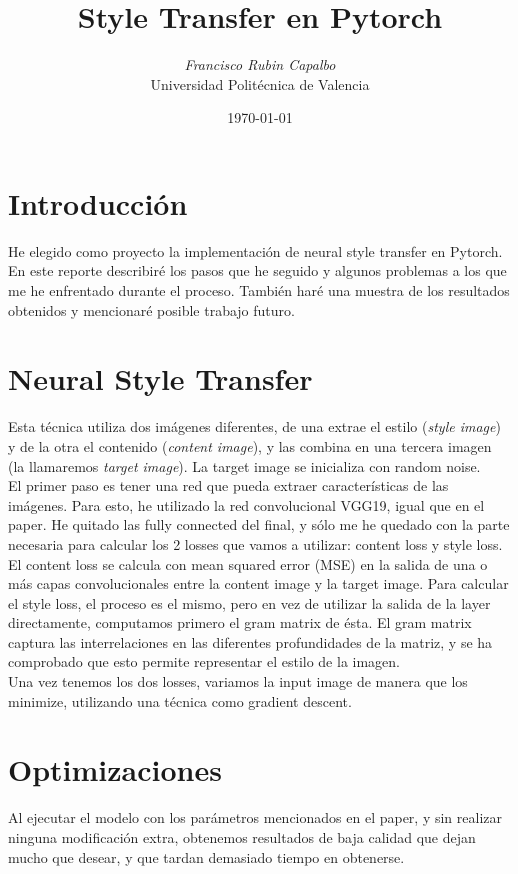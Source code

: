 \documentclass[a4paper, 11pt]{article}
\title{\Large{\textbf{Style Transfer en Pytorch}}}
\author{\textit{Francisco Rubin Capalbo}\\
		Universidad Politécnica de Valencia }
\date{\today}
\begin{document}
    
    \maketitle
    \section{Introducción}
    	He elegido como proyecto la implementación de neural style transfer\cite{neural-paper} en Pytorch. En este reporte describiré los pasos que he seguido y algunos problemas a los que me he enfrentado durante el proceso. También haré una muestra de los resultados obtenidos y mencionaré posible trabajo futuro.
    	
    	
    \section{Neural Style Transfer}
    	Esta técnica utiliza dos imágenes diferentes, de una extrae el estilo (\textit{style image}) y de la otra el contenido (\textit{content image}), y las combina en una tercera imagen (la llamaremos \textit{target image}). La target image se inicializa con random noise. \\
    	
    	El primer paso es tener una red que pueda extraer características de las imágenes. Para esto, he utilizado la red convolucional VGG19, igual que en el paper. He quitado las fully connected del final, y sólo me he quedado con la parte necesaria para calcular los 2 losses que vamos a utilizar: content loss y style loss.  \\
    	
    	El content loss se calcula con mean squared error (MSE) en la salida de una o más capas convolucionales entre la content image y la target image. Para calcular el style loss, el proceso es el mismo, pero en vez de utilizar la salida de la layer directamente, computamos primero el gram matrix de ésta. El gram matrix captura las interrelaciones en las diferentes profundidades de la matriz, y se ha comprobado que esto permite representar el estilo de la imagen.  \\
    	
    	Una vez tenemos los dos losses, variamos la input image de manera que los minimize, utilizando una técnica como gradient descent. 
    
    \section{Optimizaciones}
    	Al ejecutar el modelo con los parámetros mencionados en el paper, y sin realizar ninguna modificación extra, obtenemos resultados de baja calidad que dejan mucho que desear, y que tardan demasiado tiempo en obtenerse. 
    	
\end{document}
